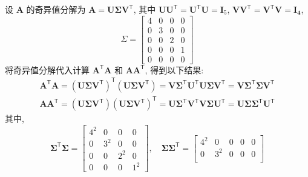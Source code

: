 \documentclass[a4paper, 12pt, UTF8]{ctexart}
\begin{document}
{\color{GoogleRed}
  \begin{solution}
      设 $\boldsymbol{A}$ 的奇异值分解为
      $\boldsymbol{A = U\Sigma V}^{\mathsf
        T}$, 其中
      $\boldsymbol{UU}^{\mathsf T} = \boldsymbol{U}^{\mathsf
        T}\boldsymbol{U}=\boldsymbol{I}_{5}$,
      $\boldsymbol{VV}^{\mathsf T} = \boldsymbol{V}^{\mathsf
        T}\boldsymbol{V} = \boldsymbol{I_{4}}$,
      \[
          \Sigma = \begin{bmatrix}
              4 & 0 & 0 & 0 \\
              0 & 3 & 0 & 0 \\
              0 & 0 & 2 & 0 \\
              0 & 0 & 0 & 1 \\
              0 & 0 & 0 & 0
          \end{bmatrix}
      \]
      将奇异值分解代入计算 $\boldsymbol{A}^{\mathsf{T}}\boldsymbol{A}$
      和 $\boldsymbol{A}\boldsymbol{A}^{\mathsf{T}}$, 得到以下结果:
      \[
          \begin{aligned}
              \boldsymbol{A}^{\mathsf{T}}\boldsymbol{A} = (\boldsymbol{U\Sigma V}^{\mathsf T})^{\mathsf T}(\boldsymbol{U\Sigma V}^{\mathsf T}) = \boldsymbol{V\Sigma}^{\mathsf T} \boldsymbol{U}^{\mathsf T}\boldsymbol{U\Sigma V}^{\mathsf T} = \boldsymbol{V\Sigma}^{\mathsf T} \boldsymbol{\Sigma V}^{\mathsf T}
              \\[3pt]
              \boldsymbol{A}\boldsymbol{A}^{\mathsf{T}} = (\boldsymbol{U\Sigma V}^{\mathsf T})(\boldsymbol{U\Sigma V}^{\mathsf T})^{\mathsf T} = \boldsymbol{U\Sigma}^{\mathsf T} \boldsymbol{V}^{\mathsf T}\boldsymbol{V\Sigma U}^{\mathsf T} = \boldsymbol{U\Sigma}\boldsymbol{\Sigma}^{\mathsf T} \boldsymbol{U}^{\mathsf T}
          \end{aligned}
      \]
      其中,
      \[
          \boldsymbol{\Sigma}^{\mathsf T} \boldsymbol{\Sigma} =
          \begin{bmatrix}
              4^{2} & 0 & 0 & 0 \\
              0 & 3^{2} & 0 & 0 \\
              0 & 0 & 2^{2} & 0 \\
              0 & 0 & 0 & 1^{2}
          \end{bmatrix}, \quad
          \boldsymbol{\Sigma} \boldsymbol{\Sigma}^{\mathsf T} =
          \begin{bmatrix}
              4^{2} & 0 & 0 & 0 & 0 \\
              0 & 3^{2} & 0 & 0 & 0 \\

\end{bmatrix}\]
\end{solution}}
\end{document}
